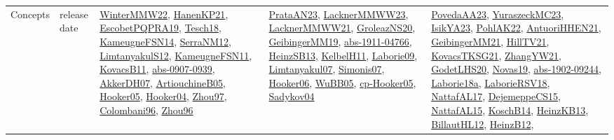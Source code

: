 {\begin{longtable}{lp{3cm}>{\raggedright}p{6cm}>{\raggedright}p{6cm}p{8cm}}
Concepts & release date & \href{papers/WinterMMW22.pdf}{WinterMMW22}\cite{WinterMMW22}, \href{papers/HanenKP21.pdf}{HanenKP21}\cite{HanenKP21}, \href{articles/EscobetPQPRA19.pdf}{EscobetPQPRA19}\cite{EscobetPQPRA19}, \href{papers/Tesch18.pdf}{Tesch18}\cite{Tesch18}, \href{articles/KameugneFSN14.pdf}{KameugneFSN14}\cite{KameugneFSN14}, \href{papers/SerraNM12.pdf}{SerraNM12}\cite{SerraNM12}, \href{articles/LimtanyakulS12.pdf}{LimtanyakulS12}\cite{LimtanyakulS12}, \href{papers/KameugneFSN11.pdf}{KameugneFSN11}\cite{KameugneFSN11}, \href{articles/KovacsB11.pdf}{KovacsB11}\cite{KovacsB11}, \href{articles/abs-0907-0939.pdf}{abs-0907-0939}\cite{abs-0907-0939}, \href{papers/AkkerDH07.pdf}{AkkerDH07}\cite{AkkerDH07}, \href{papers/ArtiouchineB05.pdf}{ArtiouchineB05}\cite{ArtiouchineB05}, \href{articles/Hooker05.pdf}{Hooker05}\cite{Hooker05}, \href{papers/Hooker04.pdf}{Hooker04}\cite{Hooker04}, \href{articles/Zhou97.pdf}{Zhou97}\cite{Zhou97}, \href{papers/Colombani96.pdf}{Colombani96}\cite{Colombani96}, \href{papers/Zhou96.pdf}{Zhou96}\cite{Zhou96} & \href{articles/PrataAN23.pdf}{PrataAN23}\cite{PrataAN23}, \href{articles/LacknerMMWW23.pdf}{LacknerMMWW23}\cite{LacknerMMWW23}, \href{papers/LacknerMMWW21.pdf}{LacknerMMWW21}\cite{LacknerMMWW21}, \href{papers/GroleazNS20.pdf}{GroleazNS20}\cite{GroleazNS20}, \href{papers/GeibingerMM19.pdf}{GeibingerMM19}\cite{GeibingerMM19}, \href{articles/abs-1911-04766.pdf}{abs-1911-04766}\cite{abs-1911-04766}, \href{articles/HeinzSB13.pdf}{HeinzSB13}\cite{HeinzSB13}, \href{articles/KelbelH11.pdf}{KelbelH11}\cite{KelbelH11}, \href{papers/Laborie09.pdf}{Laborie09}\cite{Laborie09}, \href{papers/Limtanyakul07.pdf}{Limtanyakul07}\cite{Limtanyakul07}, \href{articles/Simonis07.pdf}{Simonis07}\cite{Simonis07}, \href{articles/Hooker06.pdf}{Hooker06}\cite{Hooker06}, \href{papers/WuBB05.pdf}{WuBB05}\cite{WuBB05}, \href{papers/cp-Hooker05.pdf}{cp-Hooker05}\cite{cp-Hooker05}, \href{papers/Sadykov04.pdf}{Sadykov04}\cite{Sadykov04} & \href{papers/PovedaAA23.pdf}{PovedaAA23}\cite{PovedaAA23}, \href{papers/YuraszeckMC23.pdf}{YuraszeckMC23}\cite{YuraszeckMC23}, \href{articles/IsikYA23.pdf}{IsikYA23}\cite{IsikYA23}, \href{articles/PohlAK22.pdf}{PohlAK22}\cite{PohlAK22}, \href{papers/AntuoriHHEN21.pdf}{AntuoriHHEN21}\cite{AntuoriHHEN21}, \href{papers/GeibingerMM21.pdf}{GeibingerMM21}\cite{GeibingerMM21}, \href{papers/HillTV21.pdf}{HillTV21}\cite{HillTV21}, \href{papers/KovacsTKSG21.pdf}{KovacsTKSG21}\cite{KovacsTKSG21}, \href{articles/ZhangYW21.pdf}{ZhangYW21}\cite{ZhangYW21}, \href{papers/GodetLHS20.pdf}{GodetLHS20}\cite{GodetLHS20}, \href{articles/Novas19.pdf}{Novas19}\cite{Novas19}, \href{articles/abs-1902-09244.pdf}{abs-1902-09244}\cite{abs-1902-09244}, \href{papers/Laborie18a.pdf}{Laborie18a}\cite{Laborie18a}, \href{articles/LaborieRSV18.pdf}{LaborieRSV18}\cite{LaborieRSV18}, \href{articles/NattafAL17.pdf}{NattafAL17}\cite{NattafAL17}, \href{papers/DejemeppeCS15.pdf}{DejemeppeCS15}\cite{DejemeppeCS15}, \href{articles/NattafAL15.pdf}{NattafAL15}\cite{NattafAL15}, \href{papers/KoschB14.pdf}{KoschB14}\cite{KoschB14}, \href{papers/HeinzKB13.pdf}{HeinzKB13}\cite{HeinzKB13}, \href{papers/BillautHL12.pdf}{BillautHL12}\cite{BillautHL12}, \href{papers/HeinzB12.pdf}{HeinzB12}\cite{HeinzB12}, 
\end{longtable}}

